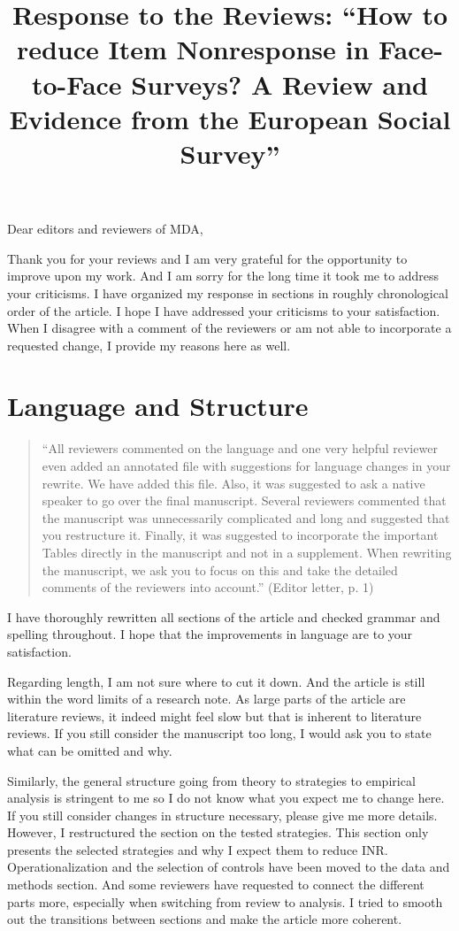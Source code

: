 \documentclass[a4paper, 12pt]{article}
\title{Response to the Reviews: “How to reduce Item Nonresponse in Face-to-Face Surveys? A Review and Evidence from the European
Social Survey”}
\begin{document}
\maketitle

Dear editors and reviewers of MDA,

Thank you for your reviews and I am very grateful for the opportunity to improve upon my work. And I am sorry for the long time it took me to address your criticisms. I have organized my response in sections in roughly chronological order of the article. I hope I have addressed your criticisms to your satisfaction. When I disagree with a comment of the reviewers or am not able to incorporate a requested change, I provide my reasons here as well.

\section{Language and Structure}

\begin{quotation}
``All reviewers commented on the language and one very helpful reviewer even added an annotated file with suggestions for language changes in your rewrite. We have added this file. Also, it was suggested to ask a native speaker to go over the final manuscript. Several reviewers commented that the manuscript was unnecessarily complicated and long and suggested that you restructure it. Finally, it was suggested to incorporate the important Tables directly in the manuscript and not in a supplement. When rewriting the manuscript, we ask you to focus on this and take the detailed comments of the reviewers into account.'' (Editor letter, p. 1)
\end{quotation}

I have thoroughly rewritten all sections of the article and checked grammar and spelling throughout. I hope that the improvements in language are to your satisfaction.

Regarding length, I am not sure where to cut it down. And the article is still within the word limits of a research note. As large parts of the article are literature reviews, it indeed might feel slow but that is inherent to literature reviews. If you still consider the manuscript too long, I would ask you to state what can be omitted and why.

Similarly, the general structure going from theory to strategies to empirical analysis is stringent to me so I do not know what you expect me to change here. If you still consider changes in structure necessary, please give me more details. However, I restructured the section on the tested strategies. This section only presents the selected strategies and why I expect them to reduce INR. Operationalization and the selection of controls have been moved to the data and methods section. And some reviewers have requested to connect the different parts more, especially when switching from review to analysis. I tried to smooth out the transitions between sections and make the article more coherent.
\end{document}
